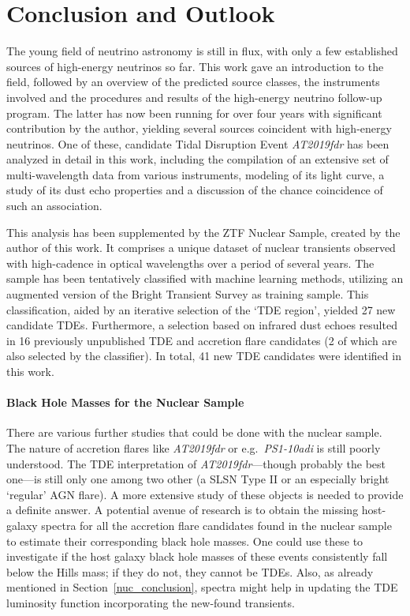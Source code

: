 \chapter*{Conclusion and Outlook}\label{conclusion}
The young field of neutrino astronomy is still in flux, with only a few established sources of high-energy neutrinos so far. This work gave an introduction to the field, followed by an overview of the predicted source classes, the instruments involved and the procedures and results of the high-energy neutrino follow-up program. The latter has now been running for over four years with significant contribution by the author, yielding several sources coincident with high-energy neutrinos. One of these, candidate Tidal Disruption Event \textit{AT2019fdr} has been analyzed in detail in this work, including the compilation of an extensive set of multi-wavelength data from various instruments, modeling of its light curve, a study of its dust echo properties and a discussion of the chance coincidence of such an association.

This analysis has been supplemented by the ZTF Nuclear Sample, created by the author of this work. It comprises a unique dataset of nuclear transients observed with high-cadence in optical wavelengths over a period of several years. The sample has been tentatively classified with machine learning methods, utilizing an augmented version of the Bright Transient Survey as training sample. This classification, aided by an iterative selection of the `TDE region', yielded 27 new candidate TDEs. Furthermore, a selection based on infrared dust echoes resulted in 16 previously unpublished TDE and accretion flare candidates (2 of which are also selected by the classifier). In total, 41 new TDE candidates were identified in this work.

\subsubsection{Black Hole Masses for the Nuclear Sample}
There are various further studies that could be done with the nuclear sample. The nature of accretion flares like \textit{AT2019fdr} or e.g.~\textit{PS1-10adi} is still poorly understood. The TDE interpretation of \textit{AT2019fdr}---though probably the best one---is still only one among two other (a SLSN Type II or an especially bright `regular' AGN flare). A more extensive study of these objects is needed to provide a definite answer. A potential avenue of research is to obtain the missing host-galaxy spectra for all the accretion flare candidates found in the nuclear sample to estimate their corresponding black hole masses. One could use these to investigate if the host galaxy black hole masses of these events consistently fall below the Hills mass; if they do not, they cannot be TDEs. Also, as already mentioned in Section~\ref{nuc_conclusion}, spectra might help in updating the TDE luminosity function incorporating the new-found transients.

